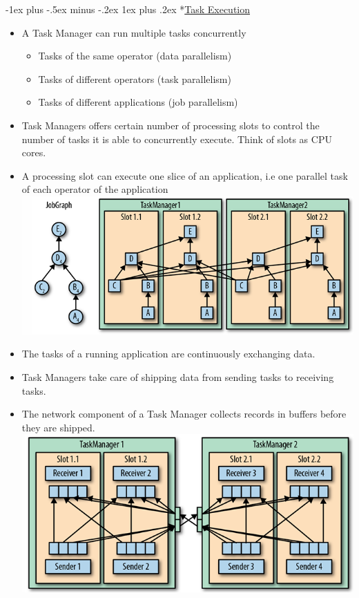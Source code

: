 \documentclass[10pt, landscape]{article}
\makeatletter
\renewcommand{\subsubsection}{\@startsection{subsubsection}{3}{0mm}%
  {-1ex plus -.5ex minus -.2ex}%
  {1ex plus .2ex}%
{\normalfont\small\bfseries}}%
\makeatother
\begin{document}
\begin{multicols*}{4}
  \subsubsection*{\underline{Task Execution}}
  \begin{itemize}
    \item A Task Manager can run multiple tasks concurrently
          \begin{itemize}
            \item Tasks of the same operator (data parallelism)
            \item Tasks of different operators (task parallelism)
            \item Tasks of different applications (job parallelism)
          \end{itemize}
    \item Task Managers offers certain number of processing slots to control the number of tasks it is able to concurrently execute. Think of slots as CPU cores.
    \item A processing slot can execute one slice of an application, i.e one parallel task of each operator of the application
    \includegraphics[width=0.95\linewidth]{flink_task_manager.png}
    \item The tasks of a running application are continuously exchanging data.
    \item Task Managers take care of shipping data from sending tasks to receiving tasks.
    \item The network component of a Task Manager collects records in buffers before they are shipped.
    \includegraphics[width=0.95\linewidth]{flink_network_component.png}
  \end{itemize}
  

\end{multicols*}
\end{document}
